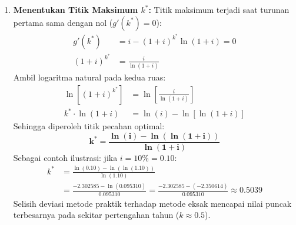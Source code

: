 \documentclass[11pt,a4paper]{article}
\begin{document}
\begin{solutionbox}[Soal 9]
\begin{enumerate}[label=(\alph*)]
    \item \textbf{Menentukan Titik Maksimum $k^*$:}
    Titik maksimum terjadi saat turunan pertama sama dengan nol ($g'(k^*) = 0$):
    \begin{align*}
        g'(k^*) &= i - (1+i)^{k^*} \ln(1+i) = 0 \\[0.5em]
        (1+i)^{k^*} &= \frac{i}{\ln(1+i)}
    \end{align*}
    Ambil logaritma natural pada kedua ruas:
    \begin{align*}
        \ln\left[(1+i)^{k^*}\right] &= \ln\left[\frac{i}{\ln(1+i)}\right] \\[0.5em]
        k^* \cdot \ln(1+i) &= \ln(i) - \ln\left[\ln(1+i)\right]
    \end{align*}
    Sehingga diperoleh titik pecahan optimal:
    \begin{equation*}
        \mathbf{k^* = \frac{\ln(i) - \ln(\ln(1+i))}{\ln(1+i)}}
    \end{equation*}
    Sebagai contoh ilustrasi: jika $i = 10\% = 0.10$:
    \begin{align*}
        k^* &= \frac{\ln(0.10) - \ln(\ln(1.10))}{\ln(1.10)} \\[0.3em]
            &= \frac{-2.302585 - \ln(0.095310)}{0.095310} = \frac{-2.302585 - (-2.350614)}{0.095310} \approx \mathbf{0.5039}
    \end{align*}
    Selisih deviasi metode praktik terhadap metode eksak mencapai nilai puncak terbesarnya pada sekitar pertengahan tahun ($k \approx 0.5$).
\end{enumerate}
\end{solutionbox}
\end{document}
